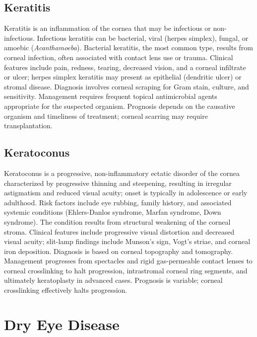 \subsection{Keratitis}
\label{sec:Keratitis}
Keratitis is an inflammation of the cornea that may be infectious or non-infectious. Infectious keratitis can be bacterial, viral (herpes simplex), fungal, or amoebic (\textit{Acanthamoeba}). Bacterial keratitis, the most common type, results from corneal infection, often associated with contact lens use or trauma. Clinical features include pain, redness, tearing, decreased vision, and a corneal infiltrate or ulcer; herpes simplex keratitis may present as epithelial (dendritic ulcer) or stromal disease. Diagnosis involves corneal scraping for Gram stain, culture, and sensitivity. Management requires frequent topical antimicrobial agents appropriate for the suspected organism. Prognosis depends on the causative organism and timeliness of treatment; corneal scarring may require transplantation.

\subsection{Keratoconus}
\label{sec:Keratoconus}
Keratoconus is a progressive, non-inflammatory ectatic disorder of the cornea characterized by progressive thinning and steepening, resulting in irregular astigmatism and reduced visual acuity; onset is typically in adolescence or early adulthood. Risk factors include eye rubbing, family history, and associated systemic conditions (Ehlers-Danlos syndrome, Marfan syndrome, Down syndrome). The condition results from structural weakening of the corneal stroma. Clinical features include progressive visual distortion and decreased visual acuity; slit-lamp findings include Munson's sign, Vogt's striae, and corneal iron deposition. Diagnosis is based on corneal topography and tomography. Management progresses from spectacles and rigid gas-permeable contact lenses to corneal crosslinking to halt progression, intrastromal corneal ring segments, and ultimately keratoplasty in advanced cases. Prognosis is variable; corneal crosslinking effectively halts progression.

\section{Dry Eye Disease}

